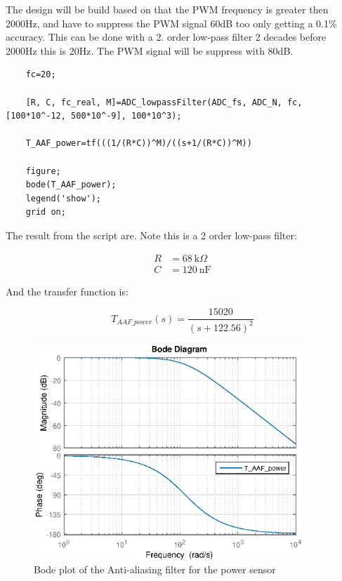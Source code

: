 The design will be build based on that the PWM frequency is greater then 2000Hz, and have to suppress the PWM signal 60dB too only getting a 0.1\% accuracy. This can be done with a 2. order low-pass filter 2 decades before 2000Hz this is 20Hz. The PWM signal will be suppress with 80dB.
	
\begin{lstlisting}
	fc=20;
	
	[R, C, fc_real, M]=ADC_lowpassFilter(ADC_fs, ADC_N, fc, [100*10^-12, 500*10^-9], 100*10^3);
	
	T_AAF_power=tf(((1/(R*C))^M)/((s+1/(R*C))^M))
	
	figure;
	bode(T_AAF_power);
	legend('show');
	grid on;
\end{lstlisting}

The result from the script are. Note this is a 2 order low-pass filter:
	
\begin{equation}
	\begin{split}
	R &= \SI{68}{\kilo\Omega}\\
	C &= \SI{120}{\nano\F}
	\end{split}
\end{equation}
	
And the transfer function is: 
	
\begin{equation}
	T_{{AAF\_power}}(s) = \frac{15020}{{(s + 122.56)}^{2}}
\end{equation}
	
\begin{figure}[H]
	\centering
	\includegraphics [width=4in]{Hardware/Pictures/FilterAnalyse_02.eps}
	\caption{Bode plot of the Anti-aliasing filter for the power sensor}
	\label{fig:BODE_AAF_power}
\end{figure}


